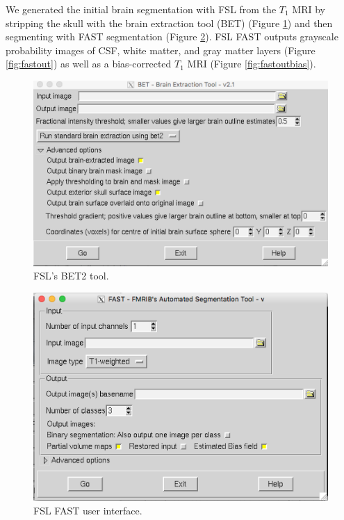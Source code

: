 We generated the initial brain segmentation with FSL from the $T_1$ MRI by stripping the skull with the brain extraction tool (BET) \cite{ref:bet1} (Figure \ref{fig:bet2}) and then segmenting with FAST segmentation (Figure \ref{fig:fslfast}). FSL FAST outputs grayscale probability images of CSF, white matter, and gray matter layers (Figure \ref{fig:fastout}) as well as a bias-corrected $T_1$ MRI (Figure \ref{fig:fastoutbias}). 

\begin{figure}[H]
\begin{center}
\includegraphics[width=.8\textwidth]{Figures/BET2}
\caption{FSL's BET2 tool.}
\label{fig:bet2}
\end{center}
\end{figure}

\begin{figure}[H]
    \centering
    \includegraphics[width=.8\textwidth]{Figures/FSL_FAST}
    \caption{FSL FAST user interface.}
    \label{fig:fslfast}
\end{figure}


